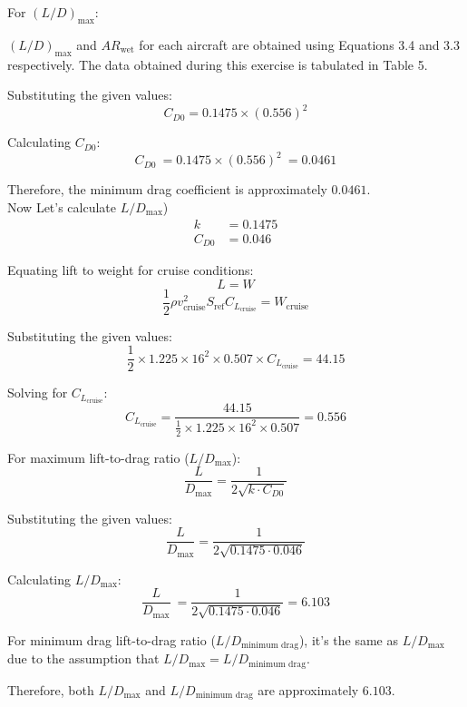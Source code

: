 \documentclass[12 pt]{article}
\begin{document}
For $(L/D)_{\text{max}}$:

$(L/D)_{\text{max}}$ and $AR_{\text{wet}}$ for each aircraft are obtained using Equations 3.4 and 3.3 respectively. The data obtained during this exercise is tabulated in Table 5.

Substituting the given values:
\[
C_{D0} = 0.1475 \times (0.556)^2
\]

Calculating \( C_{D0} \):
\[
C_{D0} \ = 0.1475 \times (0.556)^2 \ = 0.0461
\]

Therefore, the minimum drag coefficient is approximately \(0.0461\).\\
Now Let's calculate \( L/D_{\text{max}} \))
\begin{align*}
    k & = 0.1475 \\
    C_{D0} & = 0.046
\end{align*}

Equating lift to weight for cruise conditions:
\[
L = W
\]
\[
\frac{1}{2} \rho v_{\text{cruise}}^2 S_{\text{ref}} C_{L_{\text{cruise}}} = W_{\text{cruise}}
\]

Substituting the given values:
\[
\frac{1}{2} \times 1.225 \times 16^2 \times 0.507 \times C_{L_{\text{cruise}}} = 44.15
\]

Solving for $C_{L_{\text{cruise}}}$:
\[
C_{L_{\text{cruise}}} = \frac{44.15}{\frac{1}{2} \times 1.225 \times 16^2 \times 0.507} = 0.556
\]

For maximum lift-to-drag ratio (\( L/D_{\text{max}} \)):
\[
\frac{L}{D_{\text{max}}} = \frac{1}{2\sqrt{k \cdot C_{D0}}}
\]

Substituting the given values:
\[
\frac{L}{D_{\text{max}}} = \frac{1}{2\sqrt{0.1475 \cdot 0.046}}
\]

Calculating \( L/D_{\text{max}} \):
\[
\frac{L}{D_{\text{max}}} \ =  \frac{1}{2\sqrt{0.1475 \cdot 0.046}} = 6.103
\]

For minimum drag lift-to-drag ratio (\( L/D_{\text{minimum drag}} \)), it's the same as \( L/D_{\text{max}} \) due to the assumption that \( L/D_{\text{max}} = L/D_{\text{minimum drag}} \).

Therefore, both \( L/D_{\text{max}} \) and \( L/D_{\text{minimum drag}} \) are approximately \(6.103\).
\end{document}
